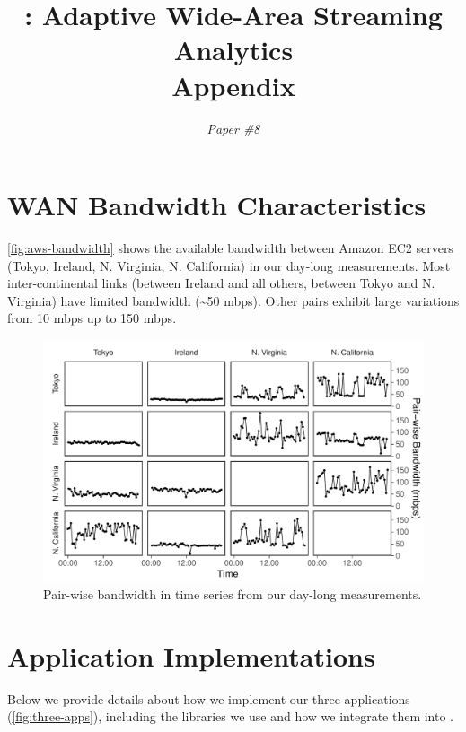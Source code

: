 \documentclass[twocolumn, 9pt]{article}
\begin{document}
\title{\sysname{}: Adaptive Wide-Area Streaming Analytics \\ Appendix}
\author{ \textit{Paper \#8} }
\date{}
\maketitle

\section{WAN Bandwidth Characteristics}

\autoref{fig:aws-bandwidth} shows the available bandwidth between Amazon EC2
servers (Tokyo, Ireland, N. Virginia, N. California) in our day-long
measurements. Most inter-continental links (between Ireland and all others,
between Tokyo and N. Virginia) have limited bandwidth (\textasciitilde 50
mbps). Other pairs exhibit large variations from 10 mbps up to 150 mbps.

\begin{figure}
  \centering
  \includegraphics[width=1\columnwidth]{figures/aws-bandwidth.pdf}
  \caption{Pair-wise bandwidth in time series from our day-long measurements.}
  \label{fig:aws-bandwidth}
\end{figure}

\section{Application Implementations}
\label{appendix:appl-impl}

Below we provide details about how we implement our three applications
(\autoref{fig:three-apps}), including the libraries we use and how we integrate
them into \sysname{}.
\end{document}

